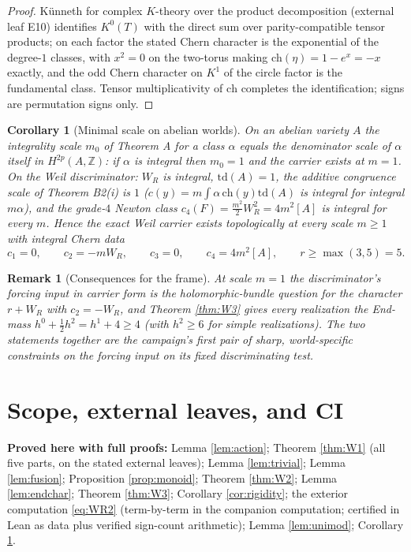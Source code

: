 \documentclass[11pt]{article}
\newtheorem{corollary}{Corollary}
\newtheorem{remark}{Remark}
\begin{document}
\begin{proof}
K\"unneth for complex $K$-theory over the product decomposition (external leaf E10) identifies $K^0(T)$ with the
direct sum over parity-compatible tensor products; on each factor the stated Chern character is the exponential of
the degree-$1$ classes, with $x^2=0$ on the two-torus making $\mathrm{ch}(\eta)=1-e^{x}=-x$ exactly, and the odd
Chern character on $K^1$ of the circle factor is the fundamental class. Tensor multiplicativity of $\mathrm{ch}$
completes the identification; signs are permutation signs only.
\end{proof}

\begin{corollary}[Minimal scale on abelian worlds]\label{cor:scale}
On an abelian variety $A$ the integrality scale $m_0$ of Theorem A for a class $\alpha$ equals the denominator
scale of $\alpha$ itself in $H^{2p}(A,\mathbb{Z})$: if $\alpha$ is integral then $m_0=1$ and the carrier exists at
$m=1$. On the Weil discriminator: $W_R$ is integral, $\mathrm{td}(A)=1$, the additive congruence scale of
Theorem B2(i) is $1$ ($c(y)=m\int\alpha\,\mathrm{ch}(y)\mathrm{td}(A)$ is integral for integral $m\alpha$), and the
grade-$4$ Newton class $c_4(F)=\tfrac{m^2}{2}W_R^2=4m^2[A]$ is integral for every $m$. Hence the exact Weil carrier
exists topologically at every scale $m\ge1$ with integral Chern data
\[
c_1=0,\qquad c_2=-mW_R,\qquad c_3=0,\qquad c_4=4m^2[A],\qquad r\ge\max(3,5)=5.
\]
\end{corollary}

\begin{remark}[Consequences for the frame]
At scale $m=1$ the discriminator's forcing input in carrier form is the holomorphic-bundle question for the
character $r+W_R$ with $c_2=-W_R$, and Theorem \ref{thm:W3} gives every realization
the End-mass $h^0+\tfrac12h^2=h^1+4\ge4$ (with $h^2\ge6$ for simple realizations). The two statements together are the campaign's first pair of sharp, world-specific
constraints on the forcing input on its fixed discriminating test.
\end{remark}

\section{Scope, external leaves, and CI}\label{sec:scope}

\textbf{Proved here with full proofs:} Lemma \ref{lem:action}; Theorem \ref{thm:W1} (all five parts, on the stated
external leaves); Lemma \ref{lem:trivial}; Lemma \ref{lem:fusion}; Proposition \ref{prop:monoid}; Theorem
\ref{thm:W2}; Lemma \ref{lem:endchar}; Theorem \ref{thm:W3}; Corollary \ref{cor:rigidity}; the exterior computation
\eqref{eq:WR2} (term-by-term in the companion computation; certified in Lean as data plus verified sign-count
arithmetic); Lemma \ref{lem:unimod}; Corollary \ref{cor:scale}.
\end{document}
